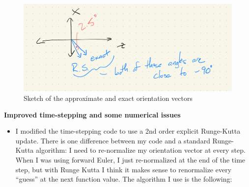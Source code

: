 \documentclass{article}
\begin{document}
\begin{figure}
  \centering
  \includegraphics[width=.75\textwidth]{orient-sketch}
  \caption{Sketch of the approximate and exact orientation vectors}
  \label{fig:orient-sketch}
\end{figure}

{\large \textbf{Improved time-stepping and some numerical issues}}

\begin{itemize}
\item I modified the time-stepping code to use a 2nd order explicit
  Runge-Kutta update. There is one difference between my code and a
  standard Runge-Kutta algorithm: I need to re-normalize my
  orientation vector at every step. When I was using forward Euler, I
  just re-normalized at the end of the time step, but with Runge Kutta
  I think it makes sense to renormalize every ``guess'' at the next
  function value. The algorithm I use is the following:
  

\end{itemize}
\end{document}
